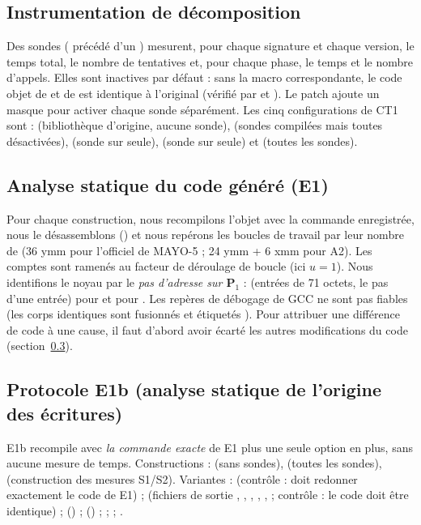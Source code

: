 \subsection{Instrumentation de décomposition}
Des sondes ( précédé d'un ) mesurent, pour chaque signature et chaque version, le temps total, le nombre de tentatives et, pour chaque phase, le temps et le nombre d'appels. Elles sont inactives par défaut : sans la macro correspondante, le code objet de  et de  est identique à l'original (vérifié par  et ). Le patch  ajoute un masque pour activer chaque sonde séparément. Les cinq configurations de CT1 sont :  (bibliothèque d'origine, aucune sonde),  (sondes compilées mais toutes désactivées),  (sonde sur  seule),  (sonde sur  seule) et  (toutes les sondes).

\subsection{Analyse statique du code généré (E1)}
Pour chaque construction, nous recompilons l'objet avec la commande enregistrée, nous le désassemblons () et nous repérons les boucles de travail par leur nombre de  (36 ymm pour l'officiel de MAYO-5 ; 24 ymm + 6 xmm pour A2). Les comptes sont ramenés au facteur de déroulage de boucle (ici $u=1$). Nous identifions le noyau par le \emph{pas d'adresse sur $\mathbf{P}_1$} :  (entrées de 71 octets, le pas d'une entrée) pour  et  pour . Les repères de débogage de GCC ne sont pas fiables (les corps identiques sont fusionnés et étiquetés ). Pour attribuer une différence de code à une cause, il faut d'abord avoir écarté les autres modifications du code (section~\ref{sec:e1b}).

\subsection{Protocole E1b (analyse statique de l'origine des écritures)}\label{sec:e1b}
E1b recompile  avec \emph{la commande exacte} de E1 plus une seule option en plus, sans aucune mesure de temps. Constructions :  (sans sondes),  (toutes les sondes),  (construction des mesures S1/S2). Variantes :  (contrôle : doit redonner exactement le code de E1) ;  (fichiers de sortie , , , , ,  ; contrôle : le code doit être identique) ;  () ;  () ;  ;  ; .

